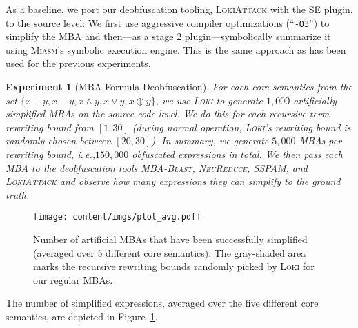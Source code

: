 \documentclass[letterpaper,twocolumn,10pt]{article}
\newcommand{\ie}{i.\,e.,\xspace}
\theoremstyle{customexample}
\theoremstyle{customexperiment}
\newtheorem{experiment}{Experiment}
\newcommand{\loki}{\textsc{Loki}\xspace}
\newcommand{\lokiattack}{\textsc{LokiAttack}\xspace}
\newcommand{\neureduce}{\textsc{NeuReduce}\xspace}
\newcommand{\sspam}{\textsc{SSPAM}\xspace}
\newcommand{\mbablast}{\textsc{MBA-Blast}\xspace}
\newcommand{\miasm}{\textsc{Miasm}\xspace}
\begin{document}
As a baseline, we port our deobfuscation tooling, \lokiattack with the SE plugin, to the source level: We first use aggressive compiler optimizations (\enquote{\texttt{-O3}}) to simplify the MBA and then---as a stage 2 plugin---symbolically summarize it using \miasm's symbolic execution engine. This is the same approach as has been used for the previous experiments.
\begin{experiment}[MBA Formula Deobfuscation]\label{experiment:mba_text_level}
For each core semantics from the set $\{x+ y, x -y , x\land y, x\lor y, x\oplus y \}$, we use \loki to generate $1,000$ artificially simplified MBAs on the source code level. We do this for each recursive term rewriting bound from $[1,30]$ (during normal operation, \loki's rewriting bound is randomly chosen between $[20,30]$). In summary, we generate $5,000$ MBAs per rewriting bound, \ie $150,000$ obfuscated expressions in total. We then pass each MBA to the deobfuscation tools \mbablast, \neureduce, \sspam, and \lokiattack and observe how many expressions they can simplify to the ground truth. 
\end{experiment}
\begin{figure}[tp]
\centering
    \texttt{[image: content/imgs/plot\_avg.pdf]}
    \caption{Number of artificial MBAs that have been successfully simplified (averaged over 5 different core semantics). The gray-shaded area marks the recursive rewriting bounds randomly picked by \loki for our regular MBAs.}
    \label{fig:mba_text_level_deobfuscation}
    \vspace{-0.6em}
\end{figure}
The number of simplified expressions, averaged over the five different core semantics, are depicted in Figure~\ref{fig:mba_text_level_deobfuscation}. 
\end{document}
